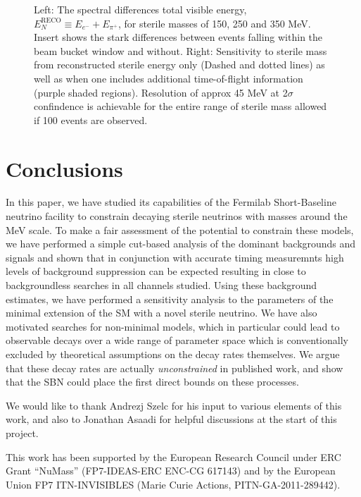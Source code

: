 \documentclass[11pt, a4paper]{article}
\begin{document}
\begin{figure}[t]
\caption{\label{fig:tof_scatter}Left: The spectral differences total visible energy, $E_N^\text{RECO} \equiv E_{e^-}+E_{\pi^+}$, for sterile masses of 150, 250 and 350 MeV. Insert shows the stark differences between events falling within the beam bucket window and without.  Right: Sensitivity to sterile mass from reconstructed sterile energy only (Dashed and dotted lines) as well as when one includes additional time-of-flight information (purple shaded regions). Resolution of approx 45 MeV at 2$\sigma$ confindence is achievable for the entire range of sterile mass allowed if 100 events are observed. }

\end{figure}



\section{\label{sec:conclusions}Conclusions}

In this paper, we have studied its capabilities of the Fermilab Short-Baseline
neutrino facility to constrain decaying sterile neutrinos with masses around
the MeV scale. To make a fair assessment of the potential to constrain these
models, we have performed a simple cut-based analysis of the dominant
backgrounds and signals and shown that in conjunction with accurate timing
measuremnts high levels of background suppression can be expected resulting in
close to backgroundless searches in all channels studied. Using these
background estimates, we have performed a sensitivity analysis to the
parameters of the minimal extension of the SM with a novel sterile neutrino.
We have also motivated searches for non-minimal models, which in
particular could lead to observable decays over a wide range of parameter space
which is conventionally excluded by theoretical assumptions on the decay rates
themselves. We argue that these decay rates are actually \emph{unconstrained}
in published work, and show that the SBN could place the first direct bounds on
these processes. 

\acknowledgments

We would like to thank Andrezj Szelc for his input to various elements of this
work, and also to Jonathan Asaadi for helpful discussions at the start of this
project.

This work has been supported by the European Research Council under ERC Grant
“NuMass” (FP7-IDEAS-ERC ENC-CG 617143) and by the European Union FP7
ITN-INVISIBLES (Marie Curie Actions, PITN-GA-2011-289442).
\end{document}
